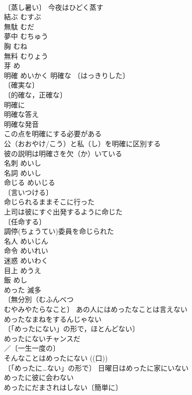 \documentclass[8pt]{extreport}
\begin{document}
\begin{CJK}{UTF8}{min}
\\	〔蒸し暑い〕 今夜はひどく蒸す 
\\	結ぶ	むすぶ	
\\	無駄	むだ	
\\	夢中	むちゅう	
\\	胸	むね	
\\	無料	むりょう	
\\	芽	め	
\\	明確	めいかく	明確な 〔はっきりした〕
\\	〔確実な〕
\\	〔的確な，正確な〕
\\	明確に 
\\	明確な答え 
\\	明確な発音 
\\	この点を明確にする必要がある 
\\	公（おおやけ/こう）と私（し）を明確に区別する 
\\	彼の説明は明確さを欠（か）いている 
\\	名刺	めいし	
\\	名詞	めいし	
\\	命じる	めいじる	
\\	〔言いつける〕
\\	命じられるままそこに行った 
\\	上司は彼にすぐ出発するように命じた 
\\	〔任命する〕
\\	調停(ちょうてい)委員を命じられた 
\\	名人	めいじん	
\\	命令	めいれい	
\\	迷惑	めいわく	
\\	目上	めうえ	
\\	飯	めし	
\\	めった	滅多	
\\	〔無分別（むふんべつ　
\\	むやみやたらなこと〕 あの人にはめったなことは言えない 
\\	めったなまねをするんじゃない 
\\	〔「めったにない」の形で，ほとんどない〕 
\\	めったにないチャンスだ 
\\	／〔一生一度の〕
\\	そんなことはめったにない ((口)) 
\\	〔「めったに…ない」の形で〕 日曜日はめったに家にいない 
\\	めったに彼に会わない 
\\	めったにだまされはしない〔簡単に〕 

\end{CJK}
\end{document}
